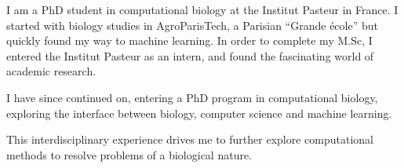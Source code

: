 \ifextended%
  I am a PhD student in computational biology at the Institut Pasteur in France. I started with biology studies in AgroParisTech, a Parisian ``Grande école'' but quickly found my way to machine learning. In order to complete my M.Sc, I entered the Institut Pasteur as an intern, and found the fascinating world of academic research.

  I have since continued on, entering a PhD program in computational biology, exploring the interface between biology, computer science and machine learning.

  This interdisciplinary experience drives me to further explore computational methods to resolve problems of a biological nature.
\fi